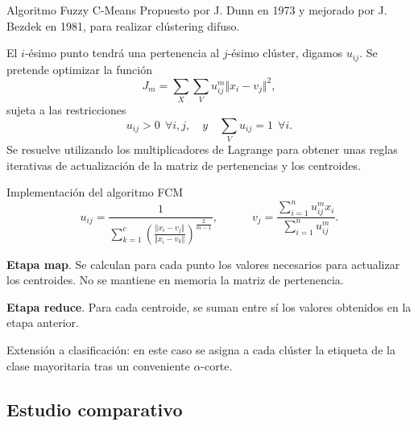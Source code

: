 \documentclass[10pt, spanish]{beamer}
\begin{document}
\begin{frame}{Algoritmo Fuzzy C-Means}
  Propuesto por J. Dunn en 1973 y mejorado por J. Bezdek en 1981, para realizar clústering difuso.

  El $i$-ésimo punto tendrá una pertenencia al $j$-ésimo clúster, digamos $u_{ij}$. Se pretende optimizar la función
  \[
    J_m = \sum_{X}\sum_{V} u_{ij}^m\Vert x_i - v_j \Vert^2,
  \]
  sujeta a las restricciones
  \[
    u_{ij}>0 \ \ \forall i, j, \quad y \quad \sum_{V}u_{ij} =1 \ \ \forall i.
  \]
  Se resuelve utilizando los multiplicadores de Lagrange para obtener unas reglas iterativas de actualización de la matriz de pertenencias y los centroides.
\end{frame}

\begin{frame}{Implementación del algoritmo FCM}
  \[
u_{ij}= \dfrac{1}{\displaystyle \sum_{k=1}^c \left( \frac{\Vert x_i - v_j \Vert}{\Vert x_i - v_k \Vert} \right)^{\frac{2}{m-1}}}, \quad \quad \quad v_j = \dfrac{\displaystyle\sum_{i=1}^n u_{ij}^m x_i}{\displaystyle\sum_{i=1}^n u_{ij}^m}.
  \]
  \vspace{.5em}

  \textbf{Etapa map}. Se calculan para cada punto los valores necesarios para actualizar los centroides. No se mantiene en memoria la matriz de pertenencia.

  \textbf{Etapa reduce}. Para cada centroide, se suman entre sí los valores obtenidos en la etapa anterior.

  Extensión a clasificación: en este caso se asigna a cada clúster la etiqueta de la clase mayoritaria tras un conveniente $\alpha$-corte.
\end{frame}

\subsection{Estudio comparativo}
\end{document}
